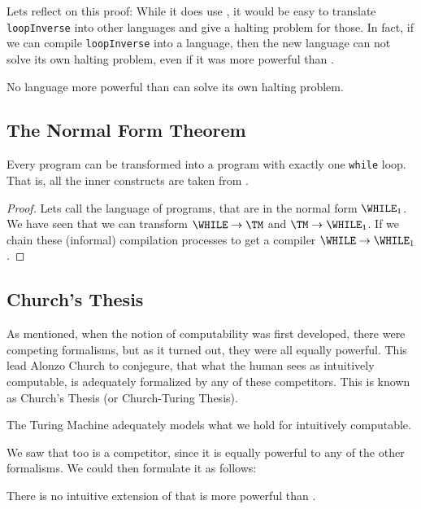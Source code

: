 Lets reflect on this proof: While it does use \WHILE, it would be easy to 
translate {\tt loopInverse} into other languages and give a halting 
problem for those. In fact, if we can compile {\tt loopInverse} into a 
language, then the new language can not solve its own halting problem, even 
if it was more powerful than \WHILE.

\begin{theorem}
	No language more powerful than \WHILE can solve its own halting problem.
\end{theorem}

\subsection{The Normal Form Theorem}
\begin{theorem}
	Every \WHILE program can be transformed into a \WHILE program with exactly 
	one {\tt while} loop. That is, all the inner constructs are taken from \FOR.
\end{theorem}
\begin{proof}
	Lets call the language of \WHILE programs, that are in the normal form $\WHILE_1$.
	We have seen that we can transform $\WHILE \rightarrow \TM$ and 
	$\TM \rightarrow \WHILE_1$. If we chain these (informal) compilation processes to 
	get a compiler $\WHILE \rightarrow \WHILE_1$.
\end{proof}

\subsection{Church's Thesis}
As mentioned, when the notion of computability was first developed, there 
were competing formalisms, but as it turned out, they were all equally 
powerful. This lead Alonzo Church to conjegure, that what the human sees 
as intuitively computable, is adequately formalized by any of these 
competitors. This is known as Church's Thesis (or Church-Turing Thesis).

\begin{theorem}
	The Turing Machine adequately models what we hold for intuitively computable.
\end{theorem}

We saw that \WHILE too is a competitor, since it is equally powerful to any 
of the other formalisms. We could then formulate it as follows:

\begin{theorem}
	There is no intuitive extension of \WHILE that is more powerful than \WHILE.
\end{theorem}

